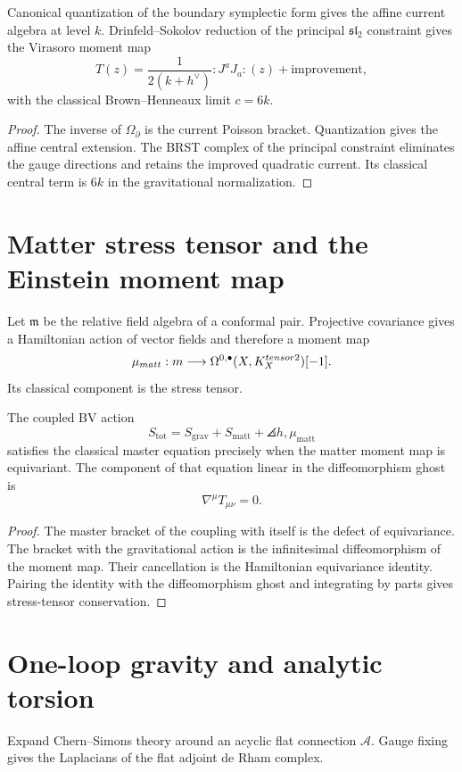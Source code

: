 \begin{theorem}
Canonical quantization of the boundary symplectic form gives the affine current algebra at level $k$.  Drinfeld--Sokolov reduction of the principal $\mathfrak{sl}_2$ constraint gives the Virasoro moment map
\[
 T(z)=\frac1{2(k+h^\vee)}:J^aJ_a:(z)+\text{improvement},
\]
with the classical Brown--Henneaux limit $c=6k$.
\end{theorem}
\begin{proof}
The inverse of $\Omega_\partial$ is the current Poisson bracket.  Quantization gives the affine central extension.  The BRST complex of the principal constraint eliminates the gauge directions and retains the improved quadratic current.  Its classical central term is $6k$ in the gravitational normalization.
\end{proof}

\chapter{Matter stress tensor and the Einstein moment map}
Let $\mathfrak m$ be the relative field algebra of a conformal pair.  Projective covariance gives a Hamiltonian action of vector fields and therefore a moment map
\[
 \mu_{matt}:m\longrightarrow
 \Omega^{0,\bullet}(X,K_X^{tensor2})[-1].
\]
Its classical component is the stress tensor.

\begin{theorem}
The coupled BV action
\[
 S_{\mathrm{tot}}=S_{\mathrm{grav}}+S_{\mathrm{matt}}
 +\angles{h,\mu_{\mathrm{matt}}}
\]
satisfies the classical master equation precisely when the matter moment map is equivariant.  The component of that equation linear in the diffeomorphism ghost is
\[
 \nabla^\mu T_{\mu\nu}=0.
\]
\end{theorem}
\begin{proof}
The master bracket of the coupling with itself is the defect of equivariance.  The bracket with the gravitational action is the infinitesimal diffeomorphism of the moment map.  Their cancellation is the Hamiltonian equivariance identity.  Pairing the identity with the diffeomorphism ghost and integrating by parts gives stress-tensor conservation.
\end{proof}

\chapter{One-loop gravity and analytic torsion}
Expand Chern--Simons theory around an acyclic flat connection $\mathcal A$.  Gauge fixing gives the Laplacians of the flat adjoint de Rham complex.

